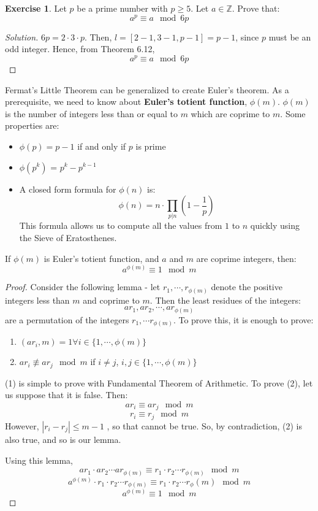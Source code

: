 \documentclass[12pt,letterpaper]{book}
\theoremstyle{definition}
\newtheorem*{exercise}{Exercise}
\newenvironment{solution}
  {\renewcommand\qedsymbol{$\blacksquare$}\begin{proof}[Solution]}
  {\end{proof}}
\newcommand{\Z}{\mathbb{Z}}
\begin{document}
\begin{exercise}
  Let $p$ be a prime number with $p \geq 5$. Let $a \in \Z$. Prove that:
  \[a^p \equiv a \mod 6p\]
\end{exercise}
\begin{solution}
  $6p = 2 \cdot 3 \cdot p$. Then, $l = [2-1,3-1, p-1] = p-1$, since $p$ must be an odd integer. Hence, from Theorem 6.12,
  \[a^p \equiv a \mod 6p\]
\end{solution}

Fermat's Little Theorem can be generalized to create Euler's theorem. As a prerequisite, we need to know about \textbf{Euler's totient function}, $\phi(m)$. $\phi(m)$ is the number of integers less than or equal to $m$ which are coprime to $m$. Some properties are:

\begin{itemize}
  \item $\phi(p) = p-1$ if and only if $p$ is prime
  \item $\phi(p^k)$ = $p^k - p^{k-1}$
  \item A closed form formula for $\phi(n)$ is:
    \[\phi(n) = n \cdot \prod_{p|n} \left (1 - \frac{1}{p} \right )\]
    This formula allows us to compute all the values from $1$ to $n$ quickly using the Sieve of Eratosthenes.
\end{itemize}

\begin{theorem}
  If $\phi(m)$ is Euler's totient function, and $a$ and $m$ are coprime integers, then:
  \[a^{\phi(m)} \equiv 1 \mod m\]
\end{theorem}
\begin{proof}
  Consider the following lemma - let $r_1, \cdots , r_{\phi(m)}$ denote the positive integers less than $m$ and coprime to $m$. Then the least residues of the integers:
  \[ar_1, ar_2, \cdots, ar_{\phi(m)}\]
  are a permutation of the integers $r_1, \cdots r_{\phi(m)}$.
  To prove this, it is enough to prove:
  \begin{enumerate}
    \item $(ar_i, m) = 1 \forall i \in \{1, \cdots, \phi(m)\}$
    \item $ar_i \not \equiv ar_j \mod m$ if $i \neq j$, $i,j \in \{1, \cdots, \phi(m)\}$
  \end{enumerate}
  (1) is simple to prove with Fundamental Theorem of Arithmetic. To prove (2), let us suppose that it is false. Then:
  \[ar_i \equiv ar_j \mod m\]
  \[r_i \equiv r_j \mod m\]
  However, $|r_i-r_j| \leq m-1$ , so that cannot be true. So, by contradiction, (2) is also true, and so is our lemma.

  Using this lemma,
  \[ar_1 \cdot ar_2 \cdots ar_{\phi(m)} \equiv r_1 \cdot r_2 \cdots r_{\phi(m)} \mod m\]
  \[a^{\phi(m)} \cdot r_1 \cdot r_2 \cdots r_{\phi(m)} \equiv r_1 \cdot r_2 \cdots r_\phi(m) \mod m\]
  \[a^{\phi(m)} \equiv 1 \mod m\]
\end{proof}
\end{document}
